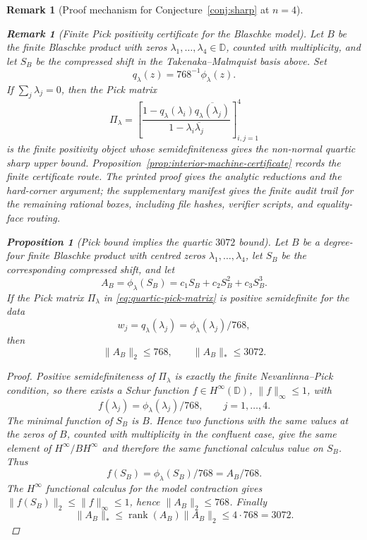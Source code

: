 \documentclass[11pt]{article}
\newtheorem{proposition}[theorem]{Proposition}
\newtheorem{remark}[theorem]{Remark}
\numberwithin{equation}{section}
\newcommand{\bbD}{\mathbb D}
\begin{document}
\begin{remark}[Proof mechanism for Conjecture~\ref{conj:sharp} at $n=4$]
\begin{remark}[Finite Pick positivity certificate for the Blaschke model]
\label{conj:pick-blaschke-certificate}
Let \(B\) be the finite Blaschke product with zeros
\(\lambda_1,\ldots,\lambda_4\in\bbD\), counted with multiplicity, and let
\(S_B\) be the compressed shift in the Takenaka--Malmquist basis above.  Set
\[
  q_\lambda(z)=768^{-1}\phi_\lambda(z).
\]
If \(\sum_j\lambda_j=0\), then the Pick matrix
\begin{equation}\label{eq:quartic-pick-matrix}
  \Pi_\lambda
  =
  \left[
  \frac{1-q_\lambda(\lambda_i)\overline{q_\lambda(\lambda_j)}}
       {1-\lambda_i\overline{\lambda_j}}
  \right]_{i,j=1}^4
\end{equation}
 is the finite positivity object whose semidefiniteness gives the non-normal
 quartic sharp upper bound.  Proposition~\ref{prop:interior-machine-certificate}
 records the finite certificate route.  The printed proof gives the analytic
 reductions and the hard-corner argument; the supplementary manifest gives the
 finite audit trail for the remaining rational boxes, including file hashes,
 verifier scripts, and equality-face routing.
\end{remark}

\begin{proposition}[Pick bound implies the quartic \(3072\) bound]
\label{prop:pick-to-3072}
Let \(B\) be a degree-four finite Blaschke product with centred zeros
\(\lambda_1,\ldots,\lambda_4\), let \(S_B\) be the corresponding compressed
shift, and let
\[
  A_B=\phi_\lambda(S_B)=c_1S_B+c_2S_B^2+c_3S_B^3 .
\]
If the Pick matrix \(\Pi_\lambda\) in
\eqref{eq:quartic-pick-matrix} is positive semidefinite for the data
\[
  w_j=q_\lambda(\lambda_j)=\phi_\lambda(\lambda_j)/768,
\]
then
\[
  \|A_B\|_2\le768,\qquad \|A_B\|_*\le3072.
\]
\end{proposition}

\begin{proof}
Positive semidefiniteness of \(\Pi_\lambda\) is exactly the finite
Nevanlinna--Pick condition, so there exists a Schur function
\(f\in H^\infty(\bbD)\), \(\|f\|_\infty\le1\), with
\[
  f(\lambda_j)=\phi_\lambda(\lambda_j)/768,\qquad j=1,\ldots,4.
\]
The minimal function of \(S_B\) is \(B\).  Hence two functions with the same
values at the zeros of \(B\), counted with multiplicity in the confluent case,
give the same element of \(H^\infty/BH^\infty\) and therefore the same
functional calculus value on \(S_B\).  Thus
\[
  f(S_B)=\phi_\lambda(S_B)/768=A_B/768.
\]
The \(H^\infty\) functional calculus for the model contraction gives
\(\|f(S_B)\|_2\le\|f\|_\infty\le1\), hence \(\|A_B\|_2\le768\).  Finally
\[
  \|A_B\|_*\le \operatorname{rank}(A_B)\|A_B\|_2\le4\cdot768=3072.
\]
\end{proof}


\end{remark}
\end{document}
